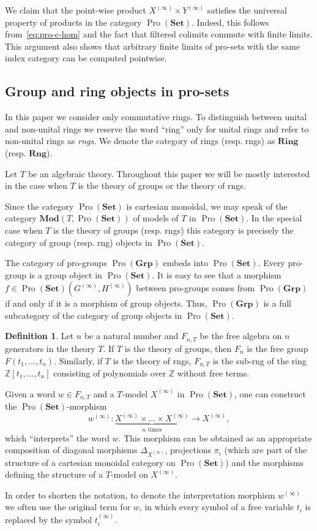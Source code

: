 \documentclass{article}
\theoremstyle{definition}
\newtheorem{df}[lemma]{Definition} \Crefname{df}{Definition}{Definitions}
\theoremstyle{remark}
\DeclareMathOperator{\Pro}{Pro}
\newcommand{\Set}{\mathbf{Set}}
\newcommand{\Group}{\mathbf{Grp}}
\newcommand{\Mod}{\mathbf{Mod}}
\begin{document}
We claim that the point-wise product $X^{(\infty)} \times Y^{(\infty)}$ satisfies the universal property of products in the category $\Pro(\Set)$. Indeed, this follows from~\eqref{eq:pro-c-hom} and the fact that filtered colimits commute with finite limits. This argument also shows that arbitrary finite limits of pro-sets with the same index category can be computed pointwise.

\subsection{Group and ring objects in pro-sets}
In this paper we consider only commutative rings.
To distinguish between unital and non-unital rings we reserve the word ``ring'' only for unital rings and refer to non-unital rings as {\it rngs}.
We denote the category of rings (resp. rngs) as $\textbf{Ring}$ (resp. $\textbf{Rng}$).

Let $T$ be an algebraic theory. Throughout this paper we will be mostly interested in the case when $T$ is the theory of groups or the theory of rngs.

Since the category $\Pro(\Set)$ is cartesian monoidal, we may speak of the category $\Mod(T, \Pro(\Set))$ of models of $T$ in \(\Pro(\Set)\).
In the special case when $T$ is the theory of groups (resp. rngs) this category is precisely the category of group (resp. rng) objects in $\Pro(\Set)$.

The category of pro-groups \(\Pro(\Group)\) embeds into \(\Pro(\Set)\). Every pro-group is a group object in \(\Pro(\Set)\). It is easy to see that a morphism \(f \in \Pro(\Set)(G^{(\infty)}, H^{(\infty)})\) between pro-groups comes from \(\Pro(\Group)\) if and only if it is a morphism of group objects. Thus, $\Pro(\Group)$ is a full subcategory of the category of group objects in $\Pro(\Set)$.

\begin{df} \label{df-pro-set-morphisms} 
 Let $n$ be a natural number and $F_{n, T}$ be the free algebra on $n$ generators in the theory $T$.
 If $T$ is the theory of groups, then $F_n$ is the free group $F(t_1,\ldots, t_n)$.
 Similarly, if $T$ is the theory of rngs, $F_{n, T}$ is the sub-rng of the ring $\mathbb{Z}[t_1,\ldots, t_n]$ consisting of polynomials over $\mathbb{Z}$ without free terms.
 
 Given a word $w \in F_{n, T}$ and a $T$-model $X^{(\infty)}$ in $\Pro(\Set)$, one can construct the $\Pro(\Set)$-morphism
 \[ w^{(\infty)} \colon \underbrace{X^{(\infty)} \times \ldots \times X^{(\infty)}}_{n\text{ times}} \to X^{(\infty)}, \]
 which ``interprets'' the word $w$. This morphism can be obtained as an appropriate composition of diagonal morphisms $\Delta_{X^{(\infty)}}$, projections $\pi_i$ 
 (which are part of the structure of a cartesian monoidal category on $\Pro(\Set)$) 
 and the morphisms defining the structure of a $T$-model on $X^{(\infty)}$.
 
 In order to shorten the notation, to denote the interpretation morphism $w^{(\infty)}$ we often use the original term for $w$, in which every symbol of a free variable $t_i$ is replaced by the symbol $t_i^{(\infty)}$.
\end{df}
\end{document}
